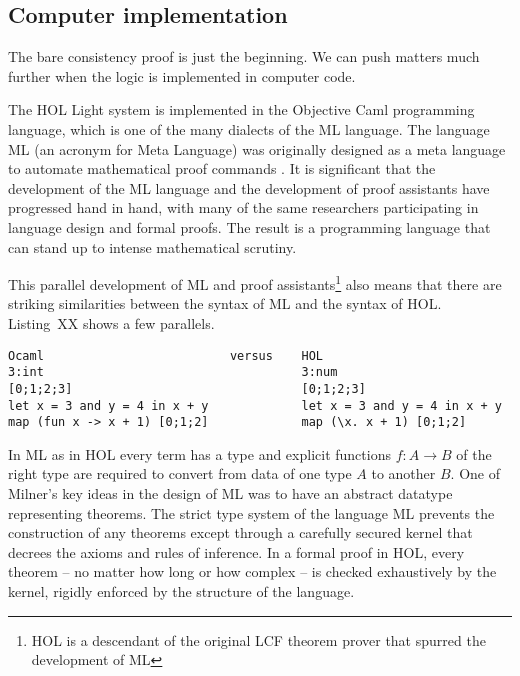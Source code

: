 \documentclass[brochure,english,12pt]{bourbaki}
\theoremstyle{plain}
\begin{document}
\subsection{Computer implementation}

The bare consistency proof is just the beginning.  We can push matters  much further when
the logic is implemented in computer code.

The HOL Light system is implemented in the Objective Caml programming language, which is one of the many dialects of the ML
language.  The language ML (an acronym for Meta Language) was originally designed as a
meta language to automate mathematical proof commands \cite{Gor}.  It is significant that the development
of the ML language and the development of proof assistants have progressed hand in hand, with many
of the same researchers participating in language design and formal proofs.  
The result is a programming language that can stand up to intense mathematical scrutiny.

This parallel development of ML and proof assistants\footnote{HOL is a descendant of the original LCF theorem prover that
spurred the development of ML} also means that there are striking similarities between
the syntax of ML and the syntax of HOL.    Listing~XX shows a few parallels.

\begin{lstlisting}[keepspaces=true,stringstyle=\tt,basicstyle=\small,frame=single,framesep=8pt,mathescape,morekeywords={type,let,and,in},columns=flexible,caption={Ocaml syntax compared with HOL syntax}]
Ocaml                          versus    HOL
3:int                                    3:num
[0;1;2;3]                                [0;1;2;3]  
let x = 3 and y = 4 in x + y             let x = 3 and y = 4 in x + y
map (fun x -> x + 1) [0;1;2]             map (\x. x + 1) [0;1;2]
\end{lstlisting}



In ML as in HOL every term has a type and explicit functions $f:A\to B$ of the right type
are required to convert from data of one type $A$ to another $B$.
One of Milner's key ideas in the design of ML was to have an abstract datatype representing theorems.
The strict type system of the language ML prevents the construction of any theorems except through
a carefully secured kernel that decrees the axioms and rules of inference.  In a formal proof in HOL, 
every theorem -- no matter how long or how complex -- is checked exhaustively by the kernel,
rigidly enforced by the structure of the language.
\end{document}
